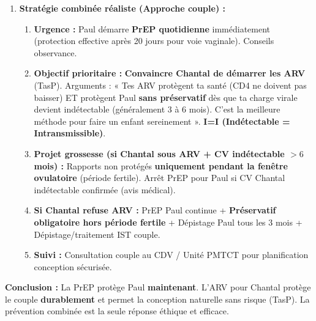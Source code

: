 \documentclass[11pt]{article}
\begin{document}
\begin{exoresolu}
\begin{enumerate}
\begin{itemize}
    \end{itemize}
    \item \textbf{Stratégie combinée réaliste (Approche couple) :}
    \begin{enumerate}
        \item \textbf{Urgence :} Paul démarre \textbf{PrEP quotidienne} immédiatement (protection effective après 20 jours pour voie vaginale). Conseils observance.
        \item \textbf{Objectif prioritaire :} \textbf{Convaincre Chantal de démarrer les ARV} (TasP). Arguments : « Tes ARV protègent ta santé (CD4 ne doivent pas baisser) ET protègent Paul \textbf{sans préservatif} dès que ta charge virale devient indétectable (généralement 3 à 6 mois). C'est la meilleure méthode pour faire un enfant sereinement ». \textbf{I=I (Indétectable = Intransmissible)}.
        \item \textbf{Projet grossesse (si Chantal sous ARV + CV indétectable $> 6$ mois) :} Rapports non protégés \textbf{uniquement pendant la fenêtre ovulatoire} (période fertile). Arrêt PrEP pour Paul si CV Chantal indétectable confirmée (avis médical).
        \item \textbf{Si Chantal refuse ARV :} PrEP Paul continue + \textbf{Préservatif obligatoire hors période fertile} + Dépistage Paul tous les 3 mois + Dépistage/traitement IST couple.
        \item \textbf{Suivi :} Consultation couple au CDV / Unité PMTCT pour planification conception sécurisée.
    \end{enumerate}
\end{enumerate}
\textbf{Conclusion :} La PrEP protège Paul \textbf{maintenant}. L'ARV pour Chantal protège le couple \textbf{durablement} et permet la conception naturelle sans risque (TasP). La prévention combinée est la seule réponse éthique et efficace.
\end{exoresolu}
\end{document}
